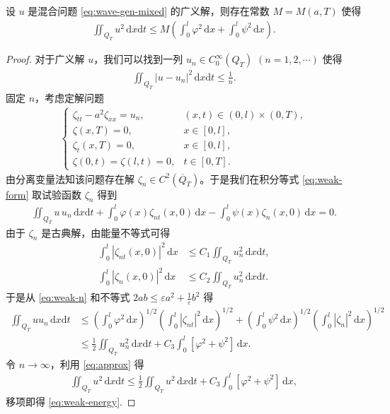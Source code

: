 \documentclass[../../main.tex]{subfiles}%
\begin{document}
\begin{theorem}
设 $u$ 是混合问题 \eqref{eq:wave-gen-mixed} 的广义解，则存在常数 $M=M(a,T)$ 使得
\begin{align}
\iint_{Q_T}u^2\,\mathrm{d}x\mathrm{d}t
\leqslant M\left(\int_0^l\varphi^2\,\mathrm{d}x+\int_0^l\psi^2\,\mathrm{d}x\right). \label{eq:weak-energy}
\end{align}
\end{theorem}
\begin{proof}
对于广义解 $u$，我们可以找到一列 $u_n\in C_0^\infty(Q_T)$ $(n=1,2,\cdots)$ 使得
\begin{align}
\iint_{Q_T}|u-u_n|^2\,\mathrm{d}x\mathrm{d}t\leqslant \frac{1}{n}. \label{eq:approx}
\end{align}
固定 $n$，考虑定解问题
\begin{align*}
\begin{cases}
\zeta_{tt}-a^2\zeta_{xx}=u_n, & (x,t)\in(0,l)\times(0,T), \\
\zeta(x,T)=0, & x\in[0,l], \\
\zeta_t(x,T)=0, & x\in[0,l], \\
\zeta(0,t)=\zeta(l,t)=0, & t\in[0,T].
\end{cases}
\end{align*}
由分离变量法知该问题存在解 $\zeta_n\in C^2(\overline{Q}_T)$。于是我们在积分等式 \eqref{eq:weak-form} 取试验函数 $\zeta_n$ 得到
\begin{align}
\iint_{Q_T}u\,u_n\,\mathrm{d}x\mathrm{d}t+\int_0^l\varphi(x)\zeta_{nt}(x,0)\,\mathrm{d}x-\int_0^l\psi(x)\zeta_n(x,0)\,\mathrm{d}x=0. \label{eq:weak-n}
\end{align}
由于 $\zeta_n$ 是古典解，由能量不等式可得
\begin{align*}
\int_0^l|\zeta_{nt}(x,0)|^2\,\mathrm{d}x &\leqslant C_1\iint_{Q_T}u_n^2\,\mathrm{d}x\mathrm{d}t,\\
\int_0^l|\zeta_n(x,0)|^2\,\mathrm{d}x &\leqslant C_2\iint_{Q_T}u_n^2\,\mathrm{d}x\mathrm{d}t.
\end{align*}
于是从 \eqref{eq:weak-n} 和不等式 $2ab\leqslant \varepsilon a^2+\frac{1}{\varepsilon}b^2$ 得
\begin{align*}
\iint_{Q_T}u u_n\,\mathrm{d}x\mathrm{d}t
&\leqslant \left(\int_0^l\varphi^2\,\mathrm{d}x\right)^{1/2}\left(\int_0^l|\zeta_{nt}|^2\,\mathrm{d}x\right)^{1/2}
+\left(\int_0^l\psi^2\,\mathrm{d}x\right)^{1/2}\left(\int_0^l|\zeta_n|^2\,\mathrm{d}x\right)^{1/2} \\
&\leqslant \frac{1}{2}\iint_{Q_T}u_n^2\,\mathrm{d}x\mathrm{d}t+C_3\int_0^l[\varphi^2+\psi^2]\,\mathrm{d}x.
\end{align*}
令 $n\to\infty$，利用 \eqref{eq:approx} 得
\begin{align*}
\iint_{Q_T}u^2\,\mathrm{d}x\mathrm{d}t
\leqslant \frac{1}{2}\iint_{Q_T}u^2\,\mathrm{d}x\mathrm{d}t+C_3\int_0^l[\varphi^2+\psi^2]\,\mathrm{d}x,
\end{align*}
移项即得 \eqref{eq:weak-energy}.
\end{proof}
\end{document}
